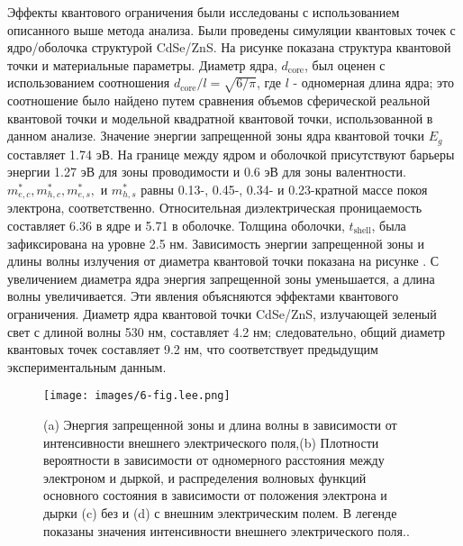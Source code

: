 \documentclass[a4paper,14pt]{extarticle}
\begin{document}
Эффекты квантового ограничения были исследованы с использованием описанного выше метода анализа. Были проведены симуляции квантовых точек с ядро/оболочка структурой CdSe/ZnS. На рисунке показана структура квантовой точки и материальные параметры. Диаметр ядра, $d_{\text{core}}$, был оценен с использованием соотношения $d_{\text{core}}/l = \sqrt{6/\pi}$, где $l$ - одномерная длина ядра; это соотношение было найдено путем сравнения объемов сферической реальной квантовой точки и модельной квадратной квантовой точки, использованной в данном анализе. Значение энергии запрещенной зоны ядра квантовой точки $E_g$ составляет 1.74 эВ. На границе между ядром и оболочкой присутствуют барьеры энергии 1.27 эВ для зоны проводимости и 0.6 эВ для зоны валентности. $m_{e,c}^*, m_{h,c}^*, m_{e,s}^*,$ и $m_{h,s}^*$ равны 0.13-, 0.45-, 0.34- и 0.23-кратной массе покоя электрона, соответственно. Относительная диэлектрическая проницаемость составляет 6.36 в ядре и 5.71 в оболочке. Толщина оболочки, $t_{\text{shell}}$, была зафиксирована на уровне 2.5 нм. Зависимость энергии запрещенной зоны и длины волны излучения от диаметра квантовой точки показана на рисунке . С увеличением диаметра ядра энергия запрещенной зоны уменьшается, а длина волны увеличивается. Эти явления объясняются эффектами квантового ограничения. Диаметр ядра квантовой точки CdSe/ZnS, излучающей зеленый свет с длиной волны 530 нм, составляет 4.2 нм; следовательно, общий диаметр квантовых точек составляет 9.2 нм, что соответствует предыдущим экспериментальным данным.\cite{lee}

\begin{figure}[htbp]
    \centering
    \texttt{[image: images/6-fig.lee.png]}
    \caption{\label{fig:lee} (a) Энергия запрещенной зоны и длина волны в зависимости от интенсивности внешнего электрического поля,(b) Плотности вероятности в зависимости от одномерного расстояния между электроном и дыркой, и распределения волновых функций основного состояния в зависимости от положения электрона и дырки (c) без и (d) с внешним электрическим полем. В легенде показаны значения интенсивности внешнего электрического поля.\cite{lee}.}
\end{figure}
\end{document}
